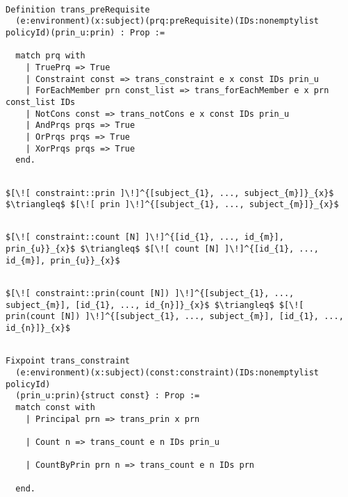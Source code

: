\begin{lstlisting}

Definition trans_preRequisite
  (e:environment)(x:subject)(prq:preRequisite)(IDs:nonemptylist policyId)(prin_u:prin) : Prop := 

  match prq with
    | TruePrq => True
    | Constraint const => trans_constraint e x const IDs prin_u 
    | ForEachMember prn const_list => trans_forEachMember e x prn const_list IDs 
    | NotCons const => trans_notCons e x const IDs prin_u 
    | AndPrqs prqs => True 
    | OrPrqs prqs => True 
    | XorPrqs prqs => True 
  end.
\end{lstlisting}








\lstset{mathescape, language=AST}  
\begin{lstlisting}[frame=single, caption={Constraint Translation {$\colon$} Principal},label={lst:transconstraintPrin}]

$[\![ constraint::prin ]\!]^{[subject_{1}, ..., subject_{m}]}_{x}$ $\triangleq$ $[\![ prin ]\!]^{[subject_{1}, ..., subject_{m}]}_{x}$ 
\end{lstlisting}

\lstset{mathescape, language=AST}  
\begin{lstlisting}[frame=single, caption={Constraint Translation {$\colon$} Count},label={lst:transconstraintCount}]

$[\![ constraint::count [N] ]\!]^{[id_{1}, ..., id_{m}], prin_{u}}_{x}$ $\triangleq$ $[\![ count [N] ]\!]^{[id_{1}, ..., id_{m}], prin_{u}}_{x}$ 
\end{lstlisting}


\lstset{mathescape, language=AST}  
\begin{lstlisting}[frame=single, caption={Constraint Translation {$\colon$} Count by Principal},label={lst:transconstraintCountbyPrin}]

$[\![ constraint::prin(count [N]) ]\!]^{[subject_{1}, ..., subject_{m}], [id_{1}, ..., id_{n}]}_{x}$ $\triangleq$ $[\![ prin(count [N]) ]\!]^{[subject_{1}, ..., subject_{m}], [id_{1}, ..., id_{n}]}_{x}$ 
\end{lstlisting}


\begin{lstlisting}

Fixpoint trans_constraint 
  (e:environment)(x:subject)(const:constraint)(IDs:nonemptylist policyId)
  (prin_u:prin){struct const} : Prop := 
  match const with
    | Principal prn => trans_prin x prn
  
    | Count n => trans_count e n IDs prin_u 

    | CountByPrin prn n => trans_count e n IDs prn 

  end.
  
\end{lstlisting}








